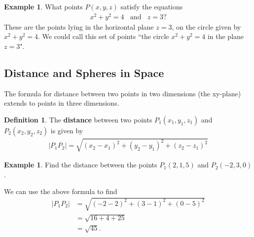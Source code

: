 \documentclass[12pt, letter]{article}
\theoremstyle{plain}
\numberwithin{theorem}{section}
\theoremstyle{definition}
\newtheorem{definition}[theorem]{Definition}
\newtheorem{example}[theorem]{Example}
\begin{document}
\bigskip

\hrulefill

\bigskip

\begin{example}
What points $P(x,y,z)$ satisfy the equations
\begin{align*}
x^2+y^2=4 \ \ \ \ \text{and} \ \ \ \ z=3?
\end{align*}
These are the points lying in the horizontal plane $z=3$, on the circle given by $x^2+y^2=4$. We could call this set of points ``the circle $x^2+y^2=4$ in the plane $z=3$".
\end{example}

\bigskip

\hrulefill

\bigskip

\subsection{Distance and Spheres in Space}
The formula for distance between two points in two dimensions (the xy-plane) extends to points in three dimensions.

\bigskip

\begin{definition}
The \textbf{distance} between two points $P_1(x_1,y_1,z_1)$ and $P_2(x_2,y_2,z_2)$ is given by
\begin{align*}
|P_1P_2| = \sqrt{(x_2-x_1)^2+(y_2-y_1)^2+(z_2-z_1)^2}
\end{align*}
\end{definition}

\bigskip

\hrulefill

\bigskip

\begin{example}
Find the distance between the points $P_1(2,1,5)$ and $P_2(-2,3,0)$.\\

\smallskip

We can use the above formula to find
\begin{align*}
|P_1P_2| &= \sqrt{(-2-2)^2+(3-1)^2+(0-5)^2}\\
&= \sqrt{16+4+25}\\
&=\sqrt{45}.
\end{align*}
\end{example}

\bigskip

\hrulefill

\bigskip
\end{document}
